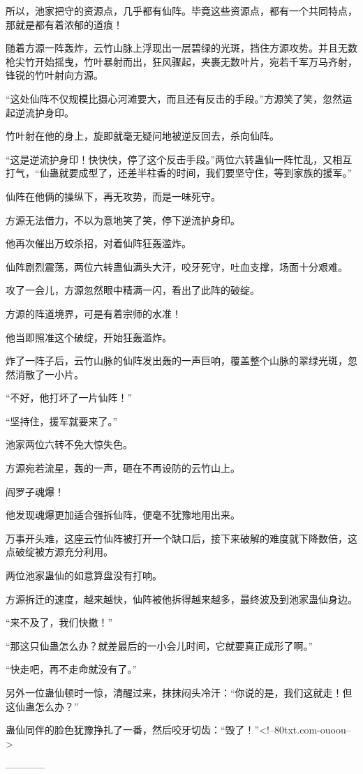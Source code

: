 \begin{this_body}
所以，池家把守的资源点，几乎都有仙阵。毕竟这些资源点，都有一个共同特点，那就是都有着浓郁的道痕！

随着方源一阵轰炸，云竹山脉上浮现出一层碧绿的光斑，挡住方源攻势。并且无数枪尖竹开始摇曳，竹叶暴射而出，狂风骤起，夹裹无数叶片，宛若千军万马齐射，锋锐的竹叶射向方源。

“这处仙阵不仅规模比摄心河滩要大，而且还有反击的手段。”方源笑了笑，忽然运起逆流护身印。

竹叶射在他的身上，旋即就毫无疑问地被逆反回去，杀向仙阵。

“这是逆流护身印！快快快，停了这个反击手段。”两位六转蛊仙一阵忙乱，又相互打气，“仙蛊就要成型了，还差半柱香的时间，我们要坚守住，等到家族的援军。”

仙阵在他俩的操纵下，再无攻势，而是一味死守。

方源无法借力，不以为意地笑了笑，停下逆流护身印。

他再次催出万蛟杀招，对着仙阵狂轰滥炸。

仙阵剧烈震荡，两位六转蛊仙满头大汗，咬牙死守，吐血支撑，场面十分艰难。

攻了一会儿，方源忽然眼中精满一闪，看出了此阵的破绽。

方源的阵道境界，可是有着宗师的水准！

他当即照准这个破绽，开始狂轰滥炸。

炸了一阵子后，云竹山脉的仙阵发出轰的一声巨响，覆盖整个山脉的翠绿光斑，忽然消散了一小片。

“不好，他打坏了一片仙阵！”

“坚持住，援军就要来了。”

池家两位六转不免大惊失色。

方源宛若流星，轰的一声，砸在不再设防的云竹山上。

阎罗子魂爆！

他发现魂爆更加适合强拆仙阵，便毫不犹豫地用出来。

万事开头难，这座云竹仙阵被打开一个缺口后，接下来破解的难度就下降数倍，这点破绽被方源充分利用。

两位池家蛊仙的如意算盘没有打响。

方源拆迁的速度，越来越快，仙阵被他拆得越来越多，最终波及到池家蛊仙身边。

“来不及了，我们快撤！”

“那这只仙蛊怎么办？就差最后的一小会儿时间，它就要真正成形了啊。”

“快走吧，再不走命就没有了。”

另外一位蛊仙顿时一惊，清醒过来，抹抹闷头冷汗：“你说的是，我们这就走！但这仙蛊怎么办？”

蛊仙同伴的脸色犹豫挣扎了一番，然后咬牙切齿：“毁了！”<!--80txt.com-ouoou-->

------------

\end{this_body}

